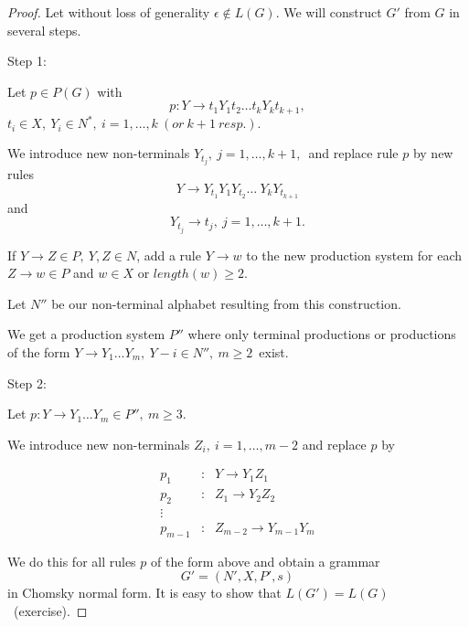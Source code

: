 \begin{proof}
Let without loss of generality $\epsilon \notin L(G)$.
We will construct $G'$ from $G$ in several steps.

Step 1: 

Let $p \in P(G)$ with 
\[
    p: Y \rightarrow t_1 Y_1 t_2 \ldots t_k Y_k t_{k+1},
\]
$t_i \in X,\ Y_i \in N^*,\ i=1,\ldots,k\ (or\ k+1\ resp.).$

We introduce new non-terminals $Y_{t_j},\ j = 1, \ldots, k+1,$\ and replace rule $p$ by new rules
\[
    Y \rightarrow Y_{t_1} Y_1 Y_{t_2} \ldots \ Y_k Y_{t_{k+1}}
\]
and
\[
    Y_{t_j} \rightarrow t_j,\ j = 1, \ldots, k+1.
\]

If $Y \rightarrow Z \in P,\ Y, Z \in N$, add a rule $Y \rightarrow w$ to the new production system for each
$Z \rightarrow w \in P$ and $w \in X$ or $length(w) \geq 2$.

Let $N''$ be our non-terminal alphabet resulting from this construction.

We get a production system $P''$ where only terminal productions or productions of the form
$Y \rightarrow Y_1 \ldots Y_m,\ Y-i \in N'',\ m \geq 2$\ exist.

Step 2:

Let $p: Y \rightarrow Y_1 \ldots Y_m \in P'',\ m \geq 3.$

We introduce new non-terminals $Z_i,\ i=1,\ldots,m-2$ and replace $p$ by

\begin{eqnarray*}
p_1 & : & Y \rightarrow Y_1 Z_1 \\
p_2 & : & Z_1 \rightarrow Y_2 Z_2 \\
\vdots \\
p_{m-1} & : & Z_{m-2} \rightarrow Y_{m-1} Y_m
\end{eqnarray*}

We do this for all rules $p$ of the form above and obtain a grammar
\[ G' = (N', X, P', s) \]
in Chomsky normal form.
It is easy to show that $L(G') = L(G)$\ (exercise).
\end{proof}
